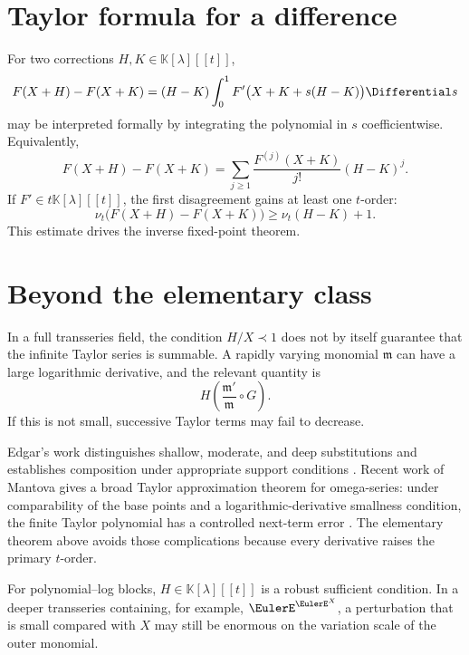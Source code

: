 \documentclass[11pt,openany]{book}
\theoremstyle{definition}
\theoremstyle{plain}
\theoremstyle{remark}
\newcommand{\K}{\mathbb{K}}
\newcommand{\m}{\mathfrak{m}}
\newcommand{\precdom}{\prec}
\newcommand{\val}{\nu}
\begin{document}
\section{Taylor formula for a difference}
For two corrections \(H,K\in\K[\lambda][[t]]\),
\begin{equation}\label{eq:taylor-difference}
 F(X+H)-F(X+K)
 =(H-K)\int_0^1F'\bigl(X+K+s(H-K)\bigr)\Differential s
\end{equation}
may be interpreted formally by integrating the polynomial in \(s\) coefficientwise. Equivalently,
\begin{equation}\label{eq:taylor-difference-series}
 F(X+H)-F(X+K)
 =\sum_{j\ge1}\frac{F^{(j)}(X+K)}{j!}(H-K)^j.
\end{equation}
If \(F'\in t\K[\lambda][[t]]\), the first disagreement gains at least one \(t\)-order:
\begin{equation}\label{eq:composition-Lipschitz}
 \val_t\bigl(F(X+H)-F(X+K)\bigr)
 \ge\val_t(H-K)+1.
\end{equation}
This estimate drives the inverse fixed-point theorem.

\section{Beyond the elementary class}
In a full transseries field, the condition \(H/X\precdom1\) does not by itself guarantee that the infinite Taylor series is summable. A rapidly varying monomial \(\m\) can have a large logarithmic derivative, and the relevant quantity is
\begin{equation}\label{eq:variation-scale}
 H\left(\frac{\m'}{\m}\circ G\right).
\end{equation}
If this is not small, successive Taylor terms may fail to decrease.

Edgar's work distinguishes shallow, moderate, and deep substitutions and establishes composition under appropriate support conditions \cite{edgar-composition,edgar-fractional}. Recent work of Mantova gives a broad Taylor approximation theorem for omega-series: under comparability of the base points and a logarithmic-derivative smallness condition, the finite Taylor polynomial has a controlled next-term error \cite{mantova-monotonicity}. The elementary theorem above avoids those complications because every derivative raises the primary \(t\)-order.

\begin{warningbox}
For polynomial--log blocks, \(H\in\K[\lambda][[t]]\) is a robust sufficient condition. In a deeper transseries containing, for example, \(\EulerE^{\EulerE^X}\), a perturbation that is small compared with \(X\) may still be enormous on the variation scale of the outer monomial.
\end{warningbox}
\end{document}
